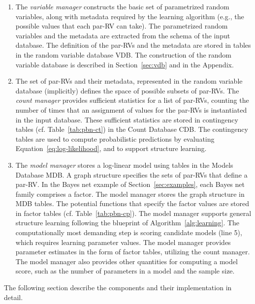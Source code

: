 \begin{enumerate}
\item The {\em variable manager} constructs the basic set of parametrized random variables, along with metadata required by the learning algorithm (e.g., the possible values that each par-RV can take). The parametrized random variables and the metadata are extracted from the schema of the input database. The definition of the par-RVs and the metadata are stored in tables in the random variable database VDB. The construction of the random variable database is described in Section~\ref{sec:vdb} and in the Appendix.
\item The set of par-RVs and their metadata, represented in the random variable database (implicitly) defines the space of possible subsets of par-RVs. The {\em count manager} provides sufficient statistics for a list of par-RVs, counting the number of times that an assignment  of values for the par-RVs is instantiated in the input database. These sufficient statistics are stored in contingency tables (cf. Table~\ref{tab:pbn-ct}) in the Count Database CDB. The contingency tables are used to compute probabilistic predictions by evaluating Equation~\ref{eq:log-likelihood}, and to support structure learning.
\item The {\em model manager} stores a log-linear model using tables in the Models Database MDB. A graph structure specifies the sets of par-RVs that define a par-RV. In the Bayes net example of Section~\ref{sec:examples}, each Bayes net family comprises a factor. The model manager stores the graph structure in MDB tables. The potential functions that specify the factor values are stored in factor tables (cf. Table~\ref{tab:pbn-cp}).
The model manager supports general structure learning following the blueprint of Algorithm~\ref{alg:learning}. The computationally most demanding step is scoring candidate models (line 5), which requires learning parameter values. The model manager provides parameter estimates in the form of factor tables, utilizing the count manager. The model manager also provides other quantities for computing a model score, such as the number of parameters in a model and the sample size. 
\end{enumerate}

The following section describe the components and their implementation in detail.

